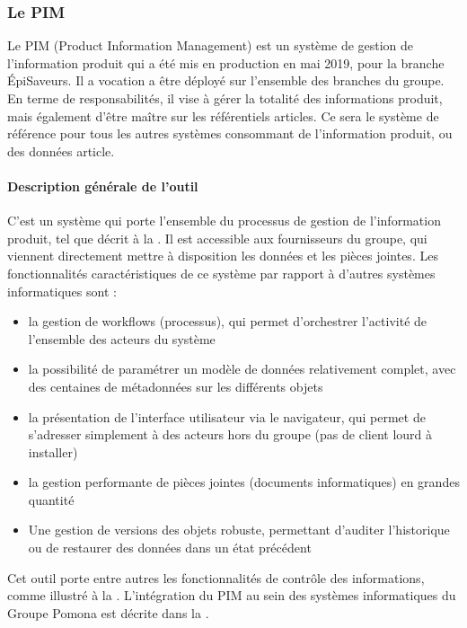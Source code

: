             \subsubsection{Le PIM}
            \label{PIM}

            Le PIM (Product Information Management) est un système de gestion de l'information produit qui a été mis en production en mai 2019, pour la branche \'{E}piSaveurs.
            Il a vocation a être déployé sur l'ensemble des branches du groupe.
            En terme de responsabilités, il vise à gérer la totalité des informations produit, mais également d'être maître sur les référentiels articles.
            Ce sera le système de référence pour tous les autres systèmes consommant de l'information produit, ou des données article.

                \paragraph{Description générale de l'outil}

                C'est un système qui porte l'ensemble du processus de gestion de l'information produit, tel que décrit à la .
                Il est accessible aux fournisseurs du groupe, qui viennent directement mettre à disposition les données et les pièces jointes.
                Les fonctionnalités caractéristiques de ce système par rapport à d'autres systèmes informatiques sont :
                \begin{itemize}
                    \item la gestion de workflows (processus), qui permet d'orchestrer l'activité de l'ensemble des acteurs du système
                    \item la possibilité de paramétrer un modèle de données relativement complet, avec des centaines de métadonnées sur les différents objets
                    \item la présentation de l'interface utilisateur via le navigateur, qui permet de s'adresser simplement à des acteurs hors du groupe (pas de client lourd à installer)
                    \item la gestion performante de pièces jointes (documents informatiques) en grandes quantité
                    \item Une gestion de versions des objets robuste, permettant d'auditer l'historique ou de restaurer des données dans un état précédent
                \end{itemize}
                Cet outil porte entre autres les fonctionnalités de contrôle des informations, comme illustré à la .
                L'intégration du PIM au sein des systèmes informatiques du Groupe Pomona est décrite dans la .

